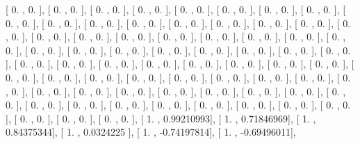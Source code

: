 \documentclass{article}
\begin{document}
       [ 0.        ,  0.        ],
       [ 0.        ,  0.        ],
       [ 0.        ,  0.        ],
       [ 0.        ,  0.        ],
       [ 0.        ,  0.        ],
       [ 0.        ,  0.        ],
       [ 0.        ,  0.        ],
       [ 0.        ,  0.        ],
       [ 0.        ,  0.        ],
       [ 0.        ,  0.        ],
       [ 0.        ,  0.        ],
       [ 0.        ,  0.        ],
       [ 0.        ,  0.        ],
       [ 0.        ,  0.        ],
       [ 0.        ,  0.        ],
       [ 0.        ,  0.        ],
       [ 0.        ,  0.        ],
       [ 0.        ,  0.        ],
       [ 0.        ,  0.        ],
       [ 0.        ,  0.        ],
       [ 0.        ,  0.        ],
       [ 0.        ,  0.        ],
       [ 0.        ,  0.        ],
       [ 0.        ,  0.        ],
       [ 0.        ,  0.        ],
       [ 0.        ,  0.        ],
       [ 0.        ,  0.        ],
       [ 0.        ,  0.        ],
       [ 0.        ,  0.        ],
       [ 0.        ,  0.        ],
       [ 0.        ,  0.        ],
       [ 0.        ,  0.        ],
       [ 0.        ,  0.        ],
       [ 0.        ,  0.        ],
       [ 0.        ,  0.        ],
       [ 0.        ,  0.        ],
       [ 0.        ,  0.        ],
       [ 0.        ,  0.        ],
       [ 0.        ,  0.        ],
       [ 0.        ,  0.        ],
       [ 0.        ,  0.        ],
       [ 0.        ,  0.        ],
       [ 0.        ,  0.        ],
       [ 0.        ,  0.        ],
       [ 0.        ,  0.        ],
       [ 0.        ,  0.        ],
       [ 0.        ,  0.        ],
       [ 0.        ,  0.        ],
       [ 0.        ,  0.        ],
       [ 0.        ,  0.        ],
       [ 0.        ,  0.        ],
       [ 0.        ,  0.        ],
       [ 0.        ,  0.        ],
       [ 0.        ,  0.        ],
       [ 0.        ,  0.        ],
       [ 0.        ,  0.        ],
       [ 0.        ,  0.        ],
       [ 0.        ,  0.        ],
       [ 0.        ,  0.        ],
       [ 0.        ,  0.        ],
       [ 0.        ,  0.        ],
       [ 0.        ,  0.        ],
       [ 0.        ,  0.        ],
       [ 0.        ,  0.        ],
       [ 0.        ,  0.        ],
       [ 0.        ,  0.        ],
       [ 0.        ,  0.        ],
       [ 0.        ,  0.        ],
       [ 0.        ,  0.        ],
       [ 1.        ,  0.99210993],
       [ 1.        ,  0.71846969],
       [ 1.        ,  0.84375344],
       [ 1.        ,  0.0324225 ],
       [ 1.        , -0.74197814],
       [ 1.        , -0.69496011],
\end{document}
